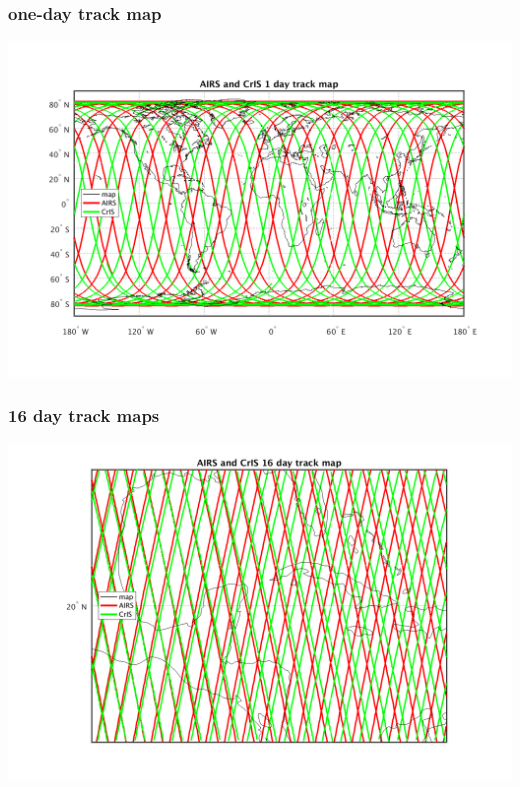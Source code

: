 \documentclass[11pt]{beamer}
\begin{document}
\begin{frame}
\frametitle{one-day track map}
\begin{center}
  \includegraphics[scale=0.5]{figures/subpt_1_day_all.png}
\end{center}
\end{frame} %
\begin{frame}
\frametitle{16 day track maps}
\begin{center}
  \includegraphics[scale=0.5]{figures/subpt_16_day_zoom.png}
\end{center}
\end{frame} %
\end{document}
